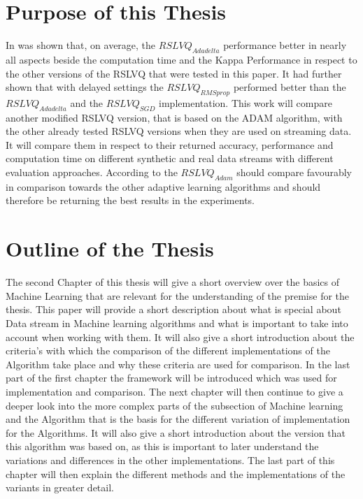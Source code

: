 \documentclass[12pt,oneside,a4paper,parskip]{scrbook}
\begin{document}
\section{Purpose of this Thesis} 
In \cite{PassiveDriftonRSLVQ} was shown that, on average, the $RSLVQ_\textit{Adadelta}$ performance better in nearly
all aspects beside the computation time and the Kappa Performance in respect to the other versions of the RSLVQ 
that were tested in this paper.
It had further shown that with delayed settings the $RSLVQ_\textit{RMSprop}$ performed better than the $RSLVQ_\textit{Adadelta}$
and the $RSLVQ_\textit{SGD}$ implementation.
This work will compare another modified RSLVQ version, that is based on the ADAM algorithm, with the other already tested
RSLVQ versions when they are used on streaming data. It will compare them in respect to their returned accuracy,
performance and computation time on different synthetic and real data streams with different evaluation approaches.
According to \cite{Kingma2014AdamAM} the $RSLVQ_\textit{Adam}$ should compare favourably in comparison towards the
other adaptive learning algorithms and should therefore be returning the best results in the experiments.


\section{Outline of the Thesis} 

The second Chapter of this thesis will give a short overview over the basics of Machine Learning that are relevant for
the understanding of the premise for the thesis. This paper will provide a short description about what is special about Data stream 
in Machine learning algorithms and what is important to take into account when working with them.
It will also give a short introduction about the criteria's with which the comparison of the different implementations 
of the Algorithm take place and why these criteria are used for  comparison.
In the last part of the first chapter the framework will be introduced which was used for implementation and comparison.
The next chapter will then continue to give a deeper look into the more complex parts of the subsection of Machine learning 
and the Algorithm that is the basis for the different variation of implementation for the Algorithms.
It will also give a short introduction about the version that this algorithm was based on, as this is important to later understand
the variations and differences in the other implementations.
The last part of this chapter will then explain the different methods and the implementations of the variants in greater detail.
\end{document}
